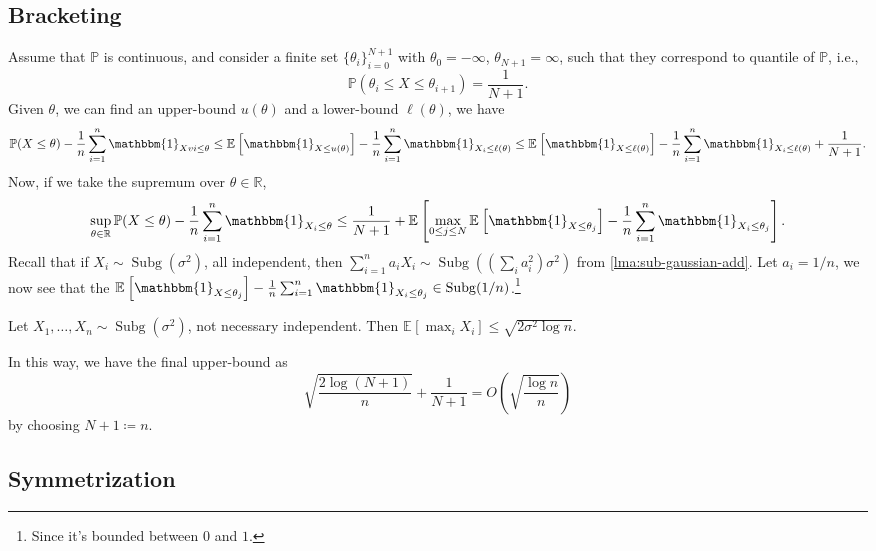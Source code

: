 \subsection{Bracketing}
Assume that \(\mathbb{P} \) is continuous, and consider a finite set \(\{ \theta _i \}_{i = 0}^{N+1} \) with \(\theta _0 = -\infty \), \(\theta _{N+1} = \infty \), such that they correspond to quantile of \(\mathbb{P} \), i.e.,
\[
	\mathbb{P} (\theta _i \leq X \leq \theta _{i+1}) = \frac{1}{N+1}.
\]
Given \(\theta \), we can find an upper-bound \(u(\theta )\) and a lower-bound \(\ell (\theta )\), we have
\[
	\mathbb{P} (X \leq \theta ) - \frac{1}{n} \sum_{i=1}^{n} \mathbbm{1}_{Xvi \leq \theta }
	\leq \mathbb{E}_{}\left[\mathbbm{1}_{X \leq u(\theta )}  \right] - \frac{1}{n}\sum_{i=1}^{n} \mathbbm{1}_{X_i \leq \ell (\theta )}
	\leq \mathbb{E}_{}\left[\mathbbm{1}_{X \leq \ell (\theta )}  \right] - \frac{1}{n}\sum_{i=1}^{n} \mathbbm{1}_{X_i \leq \ell (\theta )} + \frac{1}{N+1}.
\]
Now, if we take the supremum over \(\theta \in \mathbb{R} \),
\[
	\sup _{\theta \in \mathbb{R} } \mathbb{P} (X \leq \theta )- \frac{1}{n} \sum_{i=1}^{n} \mathbbm{1}_{X_i \leq \theta }
	\leq \frac{1}{N+1} + \mathbb{E}_{}\left[\max _{0 \leq j \leq N} \mathbb{E}_{}\left[\mathbbm{1}_{X \leq \theta _j}\right] - \frac{1}{n} \sum_{i=1}^{n} \mathbbm{1}_{X_i \leq \theta _j} \right].
\]
Recall that if \(X_i \sim \mathop{\mathrm{Subg}}(\sigma ^2) \), all independent, then \(\sum_{i=1}^{n} a_i X_i \sim \mathop{\mathrm{Subg}}((\sum_{i} a_i^2) \sigma ^2) \) from \autoref{lma:sub-gaussian-add}. Let \(a_i = 1/n\), we now see that the \(\mathbb{E}_{}\left[\mathbbm{1}_{X \leq \theta _j}\right] - \frac{1}{n} \sum_{i=1}^{n} \mathbbm{1}_{X_i \leq \theta _j} \in \mathop{\mathrm{Subg}}(1 / n) \).\footnote{Since it's bounded between \(0\) and \(1\).}

\begin{lemma}
	Let \(X_1, \dots , X_n \sim \mathop{\mathrm{Subg}}(\sigma ^{2} ) \), not necessary independent. Then \(\mathbb{E}_{}\left[\max _i X_i \right] \leq \sqrt{2 \sigma ^{2} \log n} \).
\end{lemma}

In this way, we have the final upper-bound as
\[
	\sqrt{\frac{2 \log (N+1)}{n}} + \frac{1}{N+1} = O\left( \sqrt{\frac{\log n}{n}}  \right)
\]
by choosing \(N+1 \coloneqq n\).

\subsection{Symmetrization}

